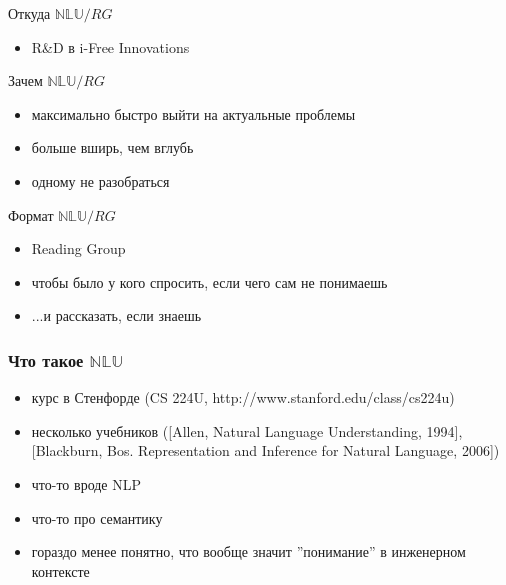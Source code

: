 \documentclass{beamer}
\begin{document}
\begin{frame}{Откуда $\mathbb{NLU}/RG$}
\begin{itemize}
  \item R\&D в i-Free Innovations
\end{itemize}
\end{frame}

\begin{frame}{Зачем $\mathbb{NLU}/RG$}
\begin{itemize}
  \item максимально быстро выйти на актуальные проблемы
  \item больше вширь, чем вглубь
  \item одному не разобраться
\end{itemize}
\end{frame}

\begin{frame}{Формат $\mathbb{NLU}/RG$}
\begin{itemize}
  \item Reading Group
  \item чтобы было у кого спросить, если чего сам не понимаешь
  \item ...и рассказать, если знаешь
\end{itemize}
\end{frame}

\begin{frame}[fragile]
\frametitle{Что такое $\mathbb{NLU}$}
\begin{itemize}
  \item курс в Стенфорде ({\scriptsize CS 224U, http://www.stanford.edu/class/cs224u})     
  \item несколько учебников ({\scriptsize [Allen, Natural Language Understanding, 1994], [Blackburn, Bos. Representation and Inference for Natural Language, 2006]})
  \item что-то вроде NLP
  \item что-то про семантику 
  \item гораздо менее понятно, что вообще значит ''понимание'' в инженерном контексте
\end{itemize}
\end{frame}
\end{document}
